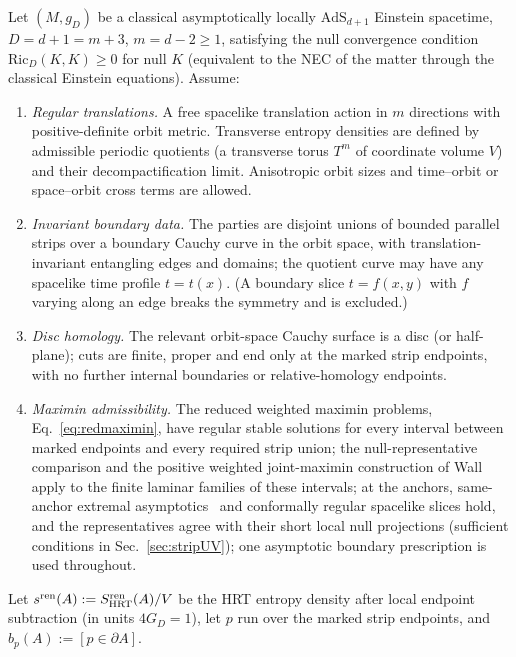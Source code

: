 \documentclass[aps,prd,onecolumn,superscriptaddress,nofootinbib,amsmath,amssymb,11pt]{revtex4-2}
\theoremstyle{definition}
\begin{document}
Let $(M,g_D)$ be a classical asymptotically locally $\mathrm{AdS}_{d+1}$ Einstein spacetime, $D=d+1=m+3$, $m=d-2\ge1$,
satisfying the null convergence condition $\mathrm{Ric}_D(K,K)\ge0$ for null $K$ (equivalent to the NEC of the matter
through the classical Einstein equations). Assume:
\begin{enumerate}
\item[(H1)] \emph{Regular translations.} A free spacelike translation action in $m$ directions with positive-definite orbit
metric. Transverse entropy densities are defined by admissible periodic quotients (a transverse torus $T^m$ of coordinate
volume $V$) and their decompactification limit. Anisotropic orbit sizes and time--orbit or space--orbit cross terms are
allowed.
\item[(H2)] \emph{Invariant boundary data.} The parties are disjoint unions of bounded parallel strips over a boundary Cauchy
curve in the orbit space, with translation-invariant entangling edges and domains; the quotient curve may have any spacelike
time profile $t=t(x)$. (A boundary slice $t=f(x,y)$ with $f$ varying along an edge breaks the symmetry and is excluded.)
\item[(H3)] \emph{Disc homology.} The relevant orbit-space Cauchy surface is a disc (or half-plane); cuts are finite, proper and
end only at the marked strip endpoints, with no further internal boundaries or relative-homology endpoints.
\item[(H4)] \emph{Maximin admissibility.} The reduced weighted maximin problems, Eq.~\eqref{eq:redmaximin}, have regular stable
solutions for every interval between marked endpoints and every required strip union; the null-representative comparison
and the positive weighted joint-maximin construction of Wall~\cite{Wall2014} apply to the finite laminar families of these
intervals; at the anchors, same-anchor extremal asymptotics~\cite{Sorce2019} and conformally regular spacelike slices hold,
and the representatives agree with their short local null projections (sufficient conditions in Sec.~\ref{sec:stripUV}); one
asymptotic boundary prescription is used throughout.
\end{enumerate}
Let $s^{\rm ren}(A):=S^{\rm ren}_{\rm HRT}(A)/V$ be the HRT entropy density after local endpoint subtraction (in units
$4G_D=1$), let $p$ run over the marked strip endpoints, and $b_p(A):=[p\in\partial A]$.
\end{document}
